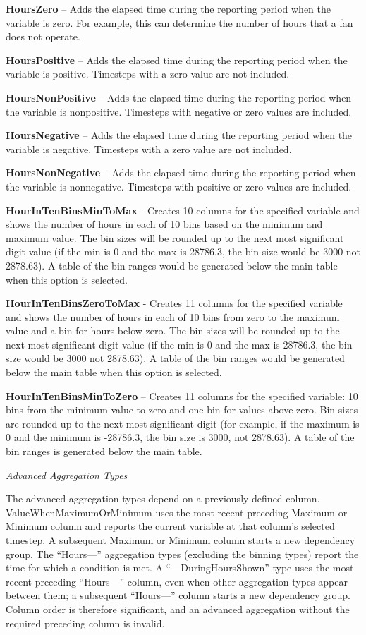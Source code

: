 \textbf{HoursZero} -- Adds the elapsed time during the reporting period when the variable is zero. For example, this can determine the number of hours that a fan does not operate.

\textbf{HoursPositive} -- Adds the elapsed time during the reporting period when the variable is positive. Timesteps with a zero value are not included.

\textbf{HoursNonPositive} -- Adds the elapsed time during the reporting period when the variable is nonpositive. Timesteps with negative or zero values are included.

\textbf{HoursNegative} -- Adds the elapsed time during the reporting period when the variable is negative. Timesteps with a zero value are not included.

\textbf{HoursNonNegative} -- Adds the elapsed time during the reporting period when the variable is nonnegative. Timesteps with positive or zero values are included.

\textbf{HourInTenBinsMinToMax} - Creates 10 columns for the specified variable and shows the number of hours in each of 10 bins based on the minimum and maximum value. The bin sizes will be rounded up to the next most significant digit value (if the min is 0 and the max is 28786.3, the bin size would be 3000 not 2878.63). A table of the bin ranges would be generated below the main table when this option is selected.

\textbf{HourInTenBinsZeroToMax} - Creates 11 columns for the specified variable and shows the number of hours in each of 10 bins from zero to the maximum value and a bin for hours below zero. The bin sizes will be rounded up to the next most significant digit value (if the min is 0 and the max is 28786.3, the bin size would be 3000 not 2878.63). A table of the bin ranges would be generated below the main table when this option is selected.

\textbf{HourInTenBinsMinToZero} -- Creates 11 columns for the specified variable: 10 bins from the minimum value to zero and one bin for values above zero. Bin sizes are rounded up to the next most significant digit (for example, if the maximum is 0 and the minimum is -28786.3, the bin size is 3000, not 2878.63). A table of the bin ranges is generated below the main table.

\emph{Advanced Aggregation Types}

The advanced aggregation types depend on a previously defined column. ValueWhenMaximumOrMinimum uses the most recent preceding Maximum or Minimum column and reports the current variable at that column's selected timestep. A subsequent Maximum or Minimum column starts a new dependency group. The ``Hours---'' aggregation types (excluding the binning types) report the time for which a condition is met. A ``---DuringHoursShown'' type uses the most recent preceding ``Hours---'' column, even when other aggregation types appear between them; a subsequent ``Hours---'' column starts a new dependency group. Column order is therefore significant, and an advanced aggregation without the required preceding column is invalid.


